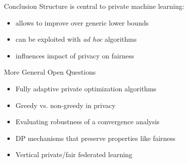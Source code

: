 \documentclass[17pt,aspectratio=169]{beamer}
\begin{document}

\begin{frame}{Conclusion}
  Structure is central to private machine learning:
  \vspace{0.5em}
  \begin{itemize}
    \setlength\itemsep{0.8em}
  \item allows to improve over generic lower bounds
  \item can be exploited with \textit{ad hoc} algorithms
  \item influences impact of privacy on fairness
  \end{itemize}


\end{frame}

\begin{frame}{More General Open Questions}
  \begin{itemize}
    \setlength\itemsep{0.8em}
  \item Fully adaptive private optimization algorithms
  \item Greedy vs. non-greedy in privacy
  \item Evaluating robustness of a convergence analysis
  \item DP mechanisms that preserve properties like fairness
  \item Vertical private/fair federated learning
  \end{itemize}
\end{frame}
\end{document}
